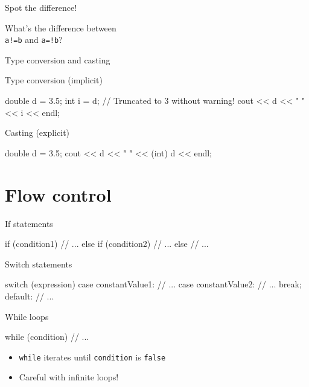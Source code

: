 \begin{frame}[fragile]{Spot the difference!}
    \begin{center}
        {\Large%
         What's the difference between \\[1em]
         \texttt{a!=b} and \texttt{a=!b}?}
    \end{center}
\end{frame}

\begin{frame}[fragile]{Type conversion and casting}
    \begin{block}{Type conversion (implicit)}
        \begin{cpp}
            double d = 3.5;
            int i = d; // Truncated to 3 without warning!
            cout << d << " " << i << endl;
        \end{cpp}
    \end{block}
    \begin{block}{Casting (explicit)}
        \begin{cpp}
            double d = 3.5;
            cout << d << " " << (int) d << endl;
        \end{cpp}
    \end{block}
\end{frame}

\section{Flow control}

\begin{frame}[fragile]{If statements}
    \begin{cpp}
        if (condition1)
        {
            // ...
        }
        else if (condition2)
        {
            // ...
        }
        else
        {
            // ...
        }
    \end{cpp}
\end{frame}

\begin{frame}[fragile]{Switch statements}
    \begin{cpp}
        switch (expression)
        {
            case constantValue1:
                // ...
            case constantValue2:
                // ...
                break;
            default:
                // ...
        }
    \end{cpp}
\end{frame}

\begin{frame}[fragile]{While loops}
    \begin{cpp}
        while (condition)
        {
            // ...
        }
    \end{cpp}
    \vspace{-1em}
    \begin{itemize}
        \item \texttt{while} iterates until \texttt{condition}
              is \texttt{false}
        \item Careful with infinite loops!
    \end{itemize}
\end{frame}

